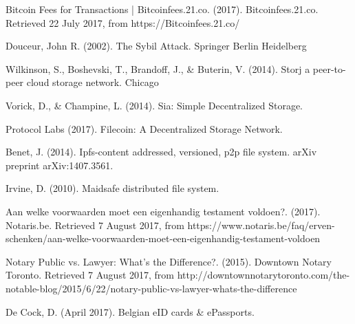 \begin{thebibliography}{99}
Bitcoin Fees for Transactions | Bitcoinfees.21.co. (2017). Bitcoinfees.21.co. Retrieved 22 July 2017, from https://Bitcoinfees.21.co/


Douceur, John R. (2002). The Sybil Attack. Springer Berlin Heidelberg


Wilkinson, S., Boshevski, T., Brandoff, J., \& Buterin, V. (2014). Storj a peer-to-peer cloud storage network. Chicago 

Vorick, D., \& Champine, L. (2014). Sia: Simple Decentralized Storage.

Protocol Labs (2017). Filecoin: A Decentralized Storage Network.

Benet, J. (2014). Ipfs-content addressed, versioned, p2p file system. arXiv preprint arXiv:1407.3561.

Irvine, D. (2010). Maidsafe distributed file system.

Aan welke voorwaarden moet een eigenhandig testament voldoen?. (2017). Notaris.be. Retrieved 7 August 2017, from https://www.notaris.be/faq/erven-schenken/aan-welke-voorwaarden-moet-een-eigenhandig-testament-voldoen

Notary Public vs. Lawyer: What's the Difference?. (2015). Downtown Notary Toronto. Retrieved 7 August 2017, from http://downtownnotarytoronto.com/the-notable-blog/2015/6/22/notary-public-vs-lawyer-whats-the-difference

De Cock, D. (April 2017). Belgian eID cards \& ePassports.

\end{thebibliography}

